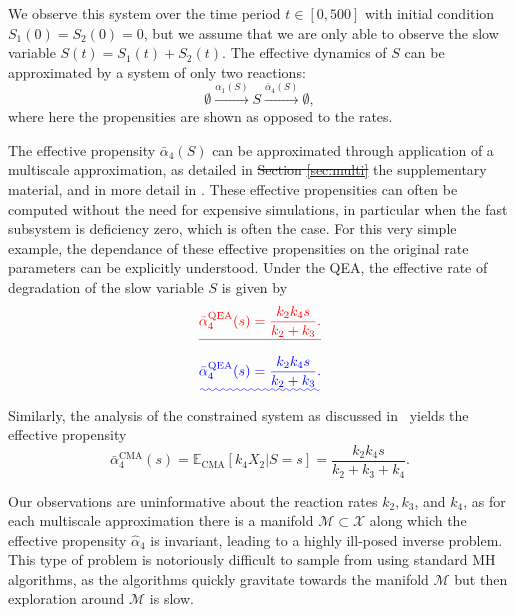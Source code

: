 \documentclass[final]{siamltex}
\newcommand{\edit}[1]{{\color{red} #1}}  %
\providecommand{\DIFadd}[1]{{\protect\color{blue}\uwave{#1}}} %
\providecommand{\DIFdel}[1]{{\protect\color{red}\sout{#1}}}                      %
\providecommand{\DIFaddbegin}{} %
\providecommand{\DIFaddend}{} %
\providecommand{\DIFdelbegin}{} %
\providecommand{\DIFdelend}{} %
\newcommand{\DIFscaledelfig}{0.5}
\newlength{\DIFdelgraphicswidth} %
\newlength{\DIFdelgraphicsheight} %
\newcommand{\DIFaddincludegraphics}[2][]{{\color{blue}\fbox{\DIFOincludegraphics[#1]{#2}}}} %
\newcommand{\DIFdelincludegraphics}[2][]{%
\sbox{\DIFdelgraphicsbox}{\DIFOincludegraphics[#1]{#2}}%
\settoboxwidth{\DIFdelgraphicswidth}{\DIFdelgraphicsbox} %
\settoboxtotalheight{\DIFdelgraphicsheight}{\DIFdelgraphicsbox} %
\scalebox{\DIFscaledelfig}{%
\parbox[b]{\DIFdelgraphicswidth}{\usebox{\DIFdelgraphicsbox}\\[-\baselineskip] \rule{\DIFdelgraphicswidth}{0em}}\llap{\resizebox{\DIFdelgraphicswidth}{\DIFdelgraphicsheight}{%
\setlength{\unitlength}{\DIFdelgraphicswidth}%
\begin{picture}(1,1)%
\thicklines\linethickness{2pt} %
{\color[rgb]{1,0,0}\put(0,0){\framebox(1,1){}}}%
{\color[rgb]{1,0,0}\put(0,0){\line( 1,1){1}}}%
{\color[rgb]{1,0,0}\put(0,1){\line(1,-1){1}}}%
\end{picture}%
}\hspace*{3pt}}} %
} %
\DeclareRobustCommand{\DIFaddbegin}{\DIFOaddbegin \let\includegraphics\DIFaddincludegraphics} %
\DeclareRobustCommand{\DIFaddend}{\DIFOaddend \let\includegraphics\DIFOincludegraphics} %
\DeclareRobustCommand{\DIFdelbegin}{\DIFOdelbegin \let\includegraphics\DIFdelincludegraphics} %
\DeclareRobustCommand{\DIFdelend}{\DIFOaddend \let\includegraphics\DIFOincludegraphics} %
\begin{document}
We observe this system over the time period $t \in [0,500]$ with
initial condition $S_1(0) = S_2(0) = 0$, but we assume that we are only able to observe
the slow variable $S(t) = S_1(t) + S_2(t)$. 
The effective dynamics of $S$ can be approximated by a system of only
two reactions:
\begin{equation}\label{eqn:QSSA_system}
	\emptyset \xrightarrow{\alpha_1(S)} S \xrightarrow{\bar{\alpha}_4(S)} \emptyset,
\end{equation}
where here the propensities are shown as opposed to the rates.

The effective propensity $\bar{\alpha}_4(S)$ can be  approximated through
application of a multiscale approximation, as detailed in \DIFdelbegin \DIFdel{Section
\ref{sec:multi}}\DIFdelend \DIFaddbegin \edit{the
  supplementary material}\DIFaddend , and in more detail in \cite{cotter2016constrained}. These effective
propensities can often be computed without the need for expensive
simulations, in particular when the fast subsystem is deficiency zero,
which is often the case\cite{anderson2010product,anderson2016product}. For this very
simple example, the dependance of these effective
propensities on the original rate parameters can be explicitly
understood. Under the QEA,
the effective rate of degradation of the slow variable $S$ is given by
\DIFdelbegin \[
	\DIFdel{\bar{\alpha}_4^{\text{QEA}}(s) = \frac{k_2k_4s}{k_2+k_3}.
}\]
\DIFdelend \DIFaddbegin \begin{equation}
	\DIFadd{\bar{\alpha}_4^{\text{QEA}}(s) = \frac{k_2k_4s}{k_2+k_3}.
}\end{equation}
\DIFaddend Similarly, the analysis of the constrained system as discussed in~\cite{cotter2016constrained} yields the effective propensity
\begin{equation}\label{eqn:chem_CMA_rate}
	\bar{\alpha}_4^{\text{CMA}}(s) = \mathbb{E}_{\text{CMA}}\left[k_4X_2|S=s\right] = \frac{k_2k_4s}{k_2+k_3+k_4}.
\end{equation}

Our observations are uninformative about the reaction rates $k_2,
k_3$, and $k_4$, as for each multiscale approximation there
is a manifold $\mathcal{M} \subset \mathcal{X}$ along which the effective propensity
$\hat{\alpha}_4$ is invariant, leading to a highly ill-posed inverse
problem. This type of problem is notoriously difficult to
sample from using standard MH algorithms, as the algorithms quickly
gravitate towards the manifold $\mathcal{M}$ but then
exploration around $\mathcal{M}$ is slow.
\end{document}
